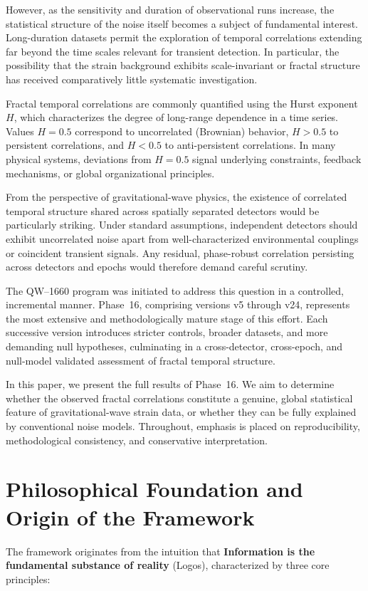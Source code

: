 \documentclass[11pt,a4paper]{article}
\begin{document}
However, as the sensitivity and duration of observational runs increase, the statistical structure of the noise itself becomes a subject of fundamental interest. Long-duration datasets permit the exploration of temporal correlations extending far beyond the time scales relevant for transient detection. In particular, the possibility that the strain background exhibits scale-invariant or fractal structure has received comparatively little systematic investigation.

Fractal temporal correlations are commonly quantified using the Hurst exponent $H$, which characterizes the degree of long-range dependence in a time series. Values $H=0.5$ correspond to uncorrelated (Brownian) behavior, $H>0.5$ to persistent correlations, and $H<0.5$ to anti-persistent correlations. In many physical systems, deviations from $H=0.5$ signal underlying constraints, feedback mechanisms, or global organizational principles.

From the perspective of gravitational-wave physics, the existence of correlated temporal structure shared across spatially separated detectors would be particularly striking. Under standard assumptions, independent detectors should exhibit uncorrelated noise apart from well-characterized environmental couplings or coincident transient signals. Any residual, phase-robust correlation persisting across detectors and epochs would therefore demand careful scrutiny.

The QW--1660 program was initiated to address this question in a controlled, incremental manner. Phase~16, comprising versions v5 through v24, represents the most extensive and methodologically mature stage of this effort. Each successive version introduces stricter controls, broader datasets, and more demanding null hypotheses, culminating in a cross-detector, cross-epoch, and null-model validated assessment of fractal temporal structure.

In this paper, we present the full results of Phase~16. We aim to determine whether the observed fractal correlations constitute a genuine, global statistical feature of gravitational-wave strain data, or whether they can be fully explained by conventional noise models. Throughout, emphasis is placed on reproducibility, methodological consistency, and conservative interpretation.

\section{Philosophical Foundation and Origin of the Framework}
The framework originates from the intuition that \textbf{Information is the fundamental substance of reality} (Logos), characterized by three core principles:
\end{document}
